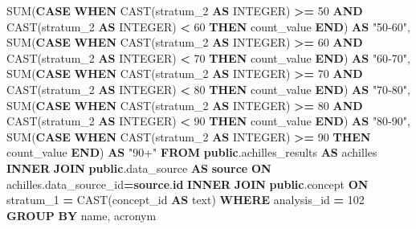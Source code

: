 \documentclass[
]{book}
\newenvironment{Shaded}{\begin{snugshade}}{\end{snugshade}}
\newcommand{\ControlFlowTok}[1]{\textcolor[rgb]{0.13,0.29,0.53}{\textbf{#1}}}
\newcommand{\DataTypeTok}[1]{\textcolor[rgb]{0.13,0.29,0.53}{#1}}
\newcommand{\DecValTok}[1]{\textcolor[rgb]{0.00,0.00,0.81}{#1}}
\newcommand{\FunctionTok}[1]{\textcolor[rgb]{0.00,0.00,0.00}{#1}}
\newcommand{\KeywordTok}[1]{\textcolor[rgb]{0.13,0.29,0.53}{\textbf{#1}}}
\newcommand{\NormalTok}[1]{#1}
\newcommand{\OperatorTok}[1]{\textcolor[rgb]{0.81,0.36,0.00}{\textbf{#1}}}
\newcommand{\OtherTok}[1]{\textcolor[rgb]{0.56,0.35,0.01}{#1}}
\begin{document}
\begin{Shaded}
\begin{Highlighting}[]
       \FunctionTok{SUM}\NormalTok{(}\ControlFlowTok{CASE} \ControlFlowTok{WHEN} \FunctionTok{CAST}\NormalTok{(stratum\_2 }\KeywordTok{AS} \DataTypeTok{INTEGER}\NormalTok{) }\OperatorTok{\textgreater{}=} \DecValTok{50} \KeywordTok{AND} \FunctionTok{CAST}\NormalTok{(stratum\_2 }\KeywordTok{AS} \DataTypeTok{INTEGER}\NormalTok{) }\OperatorTok{\textless{}} \DecValTok{60} \ControlFlowTok{THEN}\NormalTok{ count\_value }\ControlFlowTok{END}\NormalTok{) }\KeywordTok{AS} \OtherTok{"50{-}60"}\NormalTok{,}
       \FunctionTok{SUM}\NormalTok{(}\ControlFlowTok{CASE} \ControlFlowTok{WHEN} \FunctionTok{CAST}\NormalTok{(stratum\_2 }\KeywordTok{AS} \DataTypeTok{INTEGER}\NormalTok{) }\OperatorTok{\textgreater{}=} \DecValTok{60} \KeywordTok{AND} \FunctionTok{CAST}\NormalTok{(stratum\_2 }\KeywordTok{AS} \DataTypeTok{INTEGER}\NormalTok{) }\OperatorTok{\textless{}} \DecValTok{70} \ControlFlowTok{THEN}\NormalTok{ count\_value }\ControlFlowTok{END}\NormalTok{) }\KeywordTok{AS} \OtherTok{"60{-}70"}\NormalTok{,}
       \FunctionTok{SUM}\NormalTok{(}\ControlFlowTok{CASE} \ControlFlowTok{WHEN} \FunctionTok{CAST}\NormalTok{(stratum\_2 }\KeywordTok{AS} \DataTypeTok{INTEGER}\NormalTok{) }\OperatorTok{\textgreater{}=} \DecValTok{70} \KeywordTok{AND} \FunctionTok{CAST}\NormalTok{(stratum\_2 }\KeywordTok{AS} \DataTypeTok{INTEGER}\NormalTok{) }\OperatorTok{\textless{}} \DecValTok{80} \ControlFlowTok{THEN}\NormalTok{ count\_value }\ControlFlowTok{END}\NormalTok{) }\KeywordTok{AS} \OtherTok{"70{-}80"}\NormalTok{,}
       \FunctionTok{SUM}\NormalTok{(}\ControlFlowTok{CASE} \ControlFlowTok{WHEN} \FunctionTok{CAST}\NormalTok{(stratum\_2 }\KeywordTok{AS} \DataTypeTok{INTEGER}\NormalTok{) }\OperatorTok{\textgreater{}=} \DecValTok{80} \KeywordTok{AND} \FunctionTok{CAST}\NormalTok{(stratum\_2 }\KeywordTok{AS} \DataTypeTok{INTEGER}\NormalTok{) }\OperatorTok{\textless{}} \DecValTok{90} \ControlFlowTok{THEN}\NormalTok{ count\_value }\ControlFlowTok{END}\NormalTok{) }\KeywordTok{AS} \OtherTok{"80{-}90"}\NormalTok{,}
       \FunctionTok{SUM}\NormalTok{(}\ControlFlowTok{CASE} \ControlFlowTok{WHEN} \FunctionTok{CAST}\NormalTok{(stratum\_2 }\KeywordTok{AS} \DataTypeTok{INTEGER}\NormalTok{) }\OperatorTok{\textgreater{}=} \DecValTok{90} \ControlFlowTok{THEN}\NormalTok{ count\_value }\ControlFlowTok{END}\NormalTok{) }\KeywordTok{AS} \OtherTok{"90+"}
\KeywordTok{FROM} \KeywordTok{public}\NormalTok{.achilles\_results }\KeywordTok{AS}\NormalTok{ achilles}
\KeywordTok{INNER} \KeywordTok{JOIN} \KeywordTok{public}\NormalTok{.data\_source }\KeywordTok{AS} \KeywordTok{source} \KeywordTok{ON}\NormalTok{ achilles.data\_source\_id}\OperatorTok{=}\KeywordTok{source}\NormalTok{.}\KeywordTok{id}
\KeywordTok{INNER} \KeywordTok{JOIN} \KeywordTok{public}\NormalTok{.concept }\KeywordTok{ON}\NormalTok{ stratum\_1 }\OperatorTok{=} \FunctionTok{CAST}\NormalTok{(concept\_id }\KeywordTok{AS}\NormalTok{ text)}
\KeywordTok{WHERE}\NormalTok{ analysis\_id }\OperatorTok{=} \DecValTok{102}
\KeywordTok{GROUP} \KeywordTok{BY}\NormalTok{ name, acronym}
\end{Highlighting}
\end{Shaded}
\end{document}
